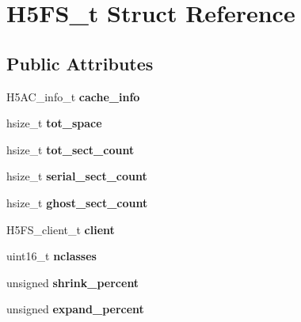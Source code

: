 \hypertarget{struct_h5_f_s__t}{}\section{H5\+F\+S\+\_\+t Struct Reference}
\label{struct_h5_f_s__t}
\subsection*{Public Attributes}
\begin{DoxyCompactItemize}
\item 
\mbox{\label{struct_h5_f_s__t_ae1759ec12b88772c1712e7df3a9b0380}} 
H5\+A\+C\+\_\+info\+\_\+t {\bfseries cache\+\_\+info}
\item 
\mbox{\label{struct_h5_f_s__t_aa6abdcde90ccdf73fef59dd76e58c021}} 
hsize\+\_\+t {\bfseries tot\+\_\+space}
\item 
\mbox{\label{struct_h5_f_s__t_a768c9b41ed1f89017c61137570399276}} 
hsize\+\_\+t {\bfseries tot\+\_\+sect\+\_\+count}
\item 
\mbox{\label{struct_h5_f_s__t_a71a791156d5e0321223e0be7b3358158}} 
hsize\+\_\+t {\bfseries serial\+\_\+sect\+\_\+count}
\item 
\mbox{\label{struct_h5_f_s__t_a27ac03651d0a3794aa0247bf2348e578}} 
hsize\+\_\+t {\bfseries ghost\+\_\+sect\+\_\+count}
\item 
\mbox{\label{struct_h5_f_s__t_a79d037c73635b52c0f432d47f96e17b8}} 
H5\+F\+S\+\_\+client\+\_\+t {\bfseries client}
\item 
\mbox{\label{struct_h5_f_s__t_a94c23161cfadb97265274466817a24de}} 
uint16\+\_\+t {\bfseries nclasses}
\item 
\mbox{\label{struct_h5_f_s__t_ad62e9beebf1bc50c79e8391dc1174874}} 
unsigned {\bfseries shrink\+\_\+percent}
\item 
\mbox{\label{struct_h5_f_s__t_a63602f455778e3fe345c2e76d3be97d4}} 
unsigned {\bfseries expand\+\_\+percent}
\item 

\end{DoxyCompactItemize}
